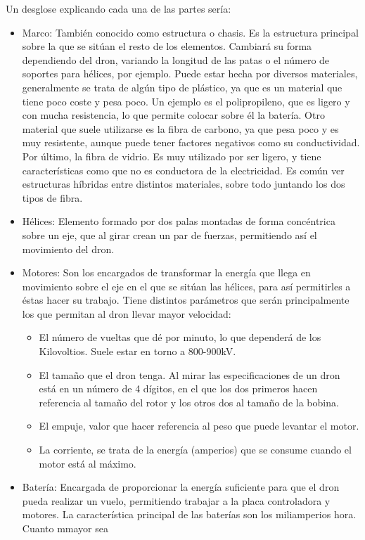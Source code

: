 Un desglose explicando cada una de las partes sería:
\begin{itemize}
\item Marco: También conocido como estructura o chasis. Es la estructura
principal sobre la que se sitúan el resto de los elementos. Cambiará su forma
dependiendo del dron, variando la longitud de las patas o el número de soportes
para hélices, por ejemplo. Puede estar hecha por diversos materiales, generalmente se
trata de algún tipo de plástico, ya que es un material que tiene poco coste y pesa poco.
Un ejemplo es el polipropileno, que es ligero y con mucha resistencia, lo que permite
colocar sobre él la batería. Otro material que suele utilizarse es la fibra de carbono,
ya que pesa poco y es muy resistente, aunque puede tener factores negativos como su
conductividad. Por último, la fibra de vidrio. Es muy utilizado por ser ligero, y tiene características como que no es conductora de la
electricidad. Es común ver estructuras híbridas entre distintos materiales, sobre todo
juntando los dos tipos de fibra.
\item Hélices: Elemento formado por dos palas montadas de forma concéntrica
sobre un eje, que al girar crean un par de fuerzas, permitiendo así el movimiento del
dron.
\item Motores: Son los encargados de transformar la energía que llega en
movimiento sobre el eje en el que se sitúan las hélices, para así permitirles a éstas
hacer su trabajo. Tiene distintos parámetros que serán principalmente
los que permitan al dron llevar mayor velocidad:
	\begin{itemize}
	\item El número de vueltas que dé por minuto, lo que dependerá de los Kilovoltios.
Suele estar en torno a 800-900kV.
	\item El tamaño que el dron tenga. Al mirar las especificaciones de un dron está en
un número de 4 dígitos, en el que los dos primeros hacen referencia al tamaño
del rotor y los otros dos al tamaño de la bobina.
	\item El empuje, valor que hacer referencia al peso que puede levantar el motor.
	\item La corriente, se trata de la energía (amperios) que se consume cuando el motor
está al máximo.
	\end{itemize}
\item Batería: Encargada de proporcionar la energía suficiente para que el dron
pueda realizar un vuelo, permitiendo trabajar a la placa controladora y motores. La
característica principal de las baterías son los miliamperios hora. Cuanto mmayor sea

\end{itemize}
